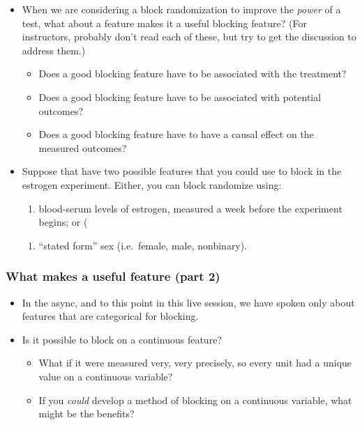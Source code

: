 \documentclass[
]{article}
\providecommand{\tightlist}{%
  \setlength{\itemsep}{0pt}\setlength{\parskip}{0pt}}
\begin{document}
\begin{itemize}
\item
  When we are considering a block randomization to improve the \emph{power} of a test, what about a feature makes it a useful blocking feature? (For instructors, probably don't read each of these, but try to get the discussion to address them.)

  \begin{itemize}
  \tightlist
  \item
    Does a good blocking feature have to be associated with the treatment?
  \item
    Does a good blocking feature have to be associated with potential outcomes?
  \item
    Does a good blocking feature have to have a causal effect on the measured outcomes?
  \end{itemize}
\item
  Suppose that have two possible features that you could use to block in the estrogen experiment. Either, you can block randomize using:

  \begin{enumerate}
  \def\labelenumi{(\alph{enumi})}
  \tightlist
  \item
    blood-serum levels of estrogen, measured a week before the experiment begins; or (
  \end{enumerate}

  \begin{enumerate}
  \def\labelenumi{\alph{enumi})}
  \setcounter{enumi}{1}
  \tightlist
  \item
    ``stated form'' sex (i.e.~female, male, nonbinary).
  \end{enumerate}
\end{itemize}

\hypertarget{what-makes-a-useful-feature-part-2}{%
\subsubsection{What makes a useful feature (part 2)}\label{what-makes-a-useful-feature-part-2}}

\begin{itemize}
\item
  In the async, and to this point in this live session, we have spoken only about features that are categorical for blocking.
\item
  Is it possible to block on a continuous feature?

  \begin{itemize}
  \tightlist
  \item
    What if it were measured very, very precisely, so every unit had a unique value on a continuous variable?
  \item
    If you \emph{could} develop a method of blocking on a continuous variable, what might be the benefits?
  \end{itemize}
\end{itemize}
\end{document}
